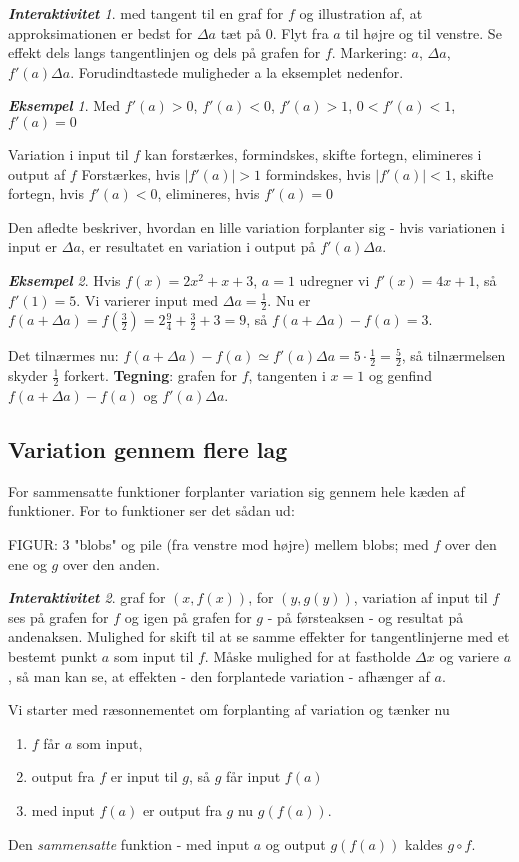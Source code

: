 \documentclass[a4paper, 12pt]{article}
\theoremstyle{remark}
\newtheorem{Eksempel}{\textbf{Eksempel}}
\newtheorem{Interaktiv}{\textbf{Interaktivitet}}
\begin{document}
\begin{Interaktiv} med tangent til en graf for $f$ og illustration af, at approksimationen er bedst for $\Delta a$ tæt på $0$. Flyt fra $a$ til højre og til venstre. Se effekt dels langs tangentlinjen og dels på grafen for $f$. Markering: $a$, $\Delta a$, $f'(a)\Delta a$. Forudindtastede muligheder a la eksemplet nedenfor.
\end{Interaktiv}

\begin{Eksempel} Med $f'(a)>0$, $f'(a)<0$, $f'(a)>1$, $0<f'(a)<1$, $f'(a)=0$


 Variation i input til $f$  kan forstærkes, formindskes, skifte fortegn, elimineres i output af $f$  Forstærkes, hvis $|f'(a)|>1$ formindskes, hvis  $|f'(a)|<1$, skifte fortegn, hvis $f'(a)<0$, elimineres, hvis $f'(a)=0$
\end{Eksempel}

Den afledte beskriver, hvordan en lille variation forplanter sig - hvis variationen i input  er $\Delta a$, er resultatet en variation i output på $f'(a)\Delta a$.

\begin{Eksempel} Hvis $f(x)=2x^2+x+3$, $a=1$ udregner vi $f'(x)=4x+1$, så $f'(1)=5$. Vi varierer input med $\Delta a=\frac{1}{2}$. Nu er $f(a+\Delta a)= f(\frac{3}{2})=2\frac{9}{4}+\frac{3}{2}+3=9$, så $f(a+\Delta a)-f(a)=3$.

Det tilnærmes nu:  $f(a+\Delta a)-f(a)\simeq f'(a)\Delta a=5\cdot \frac{1}{2}=\frac{5}{2}$, så tilnærmelsen skyder $\frac{1}{2}$ forkert. {\bf{Tegning}}: grafen for $f$, tangenten i $x=1$ og genfind $f(a+\Delta a)-f(a)$ og $f'(a)\Delta a$. 
\end{Eksempel}

\subsection*{Variation gennem flere lag} For sammensatte funktioner forplanter variation sig gennem hele kæden af funktioner. For to funktioner ser det sådan ud:

FIGUR: 3 "blobs" og pile (fra venstre mod højre) mellem blobs; med $f$ over den ene og $g$ over den anden.
\begin{Interaktiv}
graf for $(x,f(x))$, for $(y,g(y))$, variation af input til $f$ ses på grafen for $f$ og igen på grafen for $g$ - på førsteaksen - og resultat på andenaksen.  Mulighed for skift til at se samme effekter for tangentlinjerne med et bestemt punkt $a$ som input til $f$. Måske mulighed for at fastholde $\Delta x$ og variere $a$, så man kan se, at effekten - den forplantede variation - afhænger af $a$.
\end{Interaktiv}
Vi starter med ræsonnementet om forplanting af variation og tænker nu
\begin{enumerate}
\item $f$ får $a$ som input,
\item output fra $f$ er input til $g$, så $g$ får  input $f(a)$
\item med input $f(a)$ er output fra $g$ nu  $g(f(a))$.
\end{enumerate}
 Den \emph{sammensatte} funktion - med input $a$ og output $g(f(a))$ kaldes $g\circ f$.\\
\end{document}
